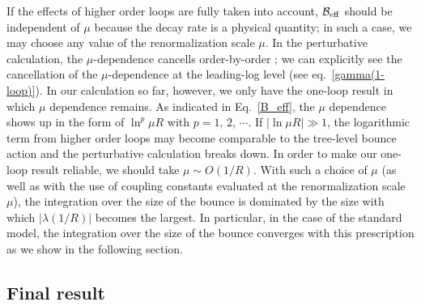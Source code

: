 \documentclass[12pt]{article}
\begin{document}
If the effects of higher order loops are fully taken into account,
$\mathcal{B}_{\rm eff}$ should be independent of $\mu$ because the decay
rate is a physical quantity; in such a case, we may choose any value of
the renormalization scale $\mu$.  In the perturbative calculation, the
$\mu$-dependence cancells order-by-order \cite{Endo:2015ixx}; we can
explicitly see the cancellation of the $\mu$-dependence at the
leading-log level (see eq.\ \eqref{gamma(1-loop)}).  In our calculation
so far, however, we only have the one-loop result in which $\mu$
dependence remains.  As indicated in Eq.\ \eqref{B_eff}, the $\mu$
dependence shows up in the form of $\ln^p \mu R$ with $p=1$, $2$,
$\cdots$.  If $|\ln\mu R|\gg 1$, the logarithmic term from higher order
loops may become comparable to the tree-level bounce action and the
perturbative calculation breaks down.  In order to make our one-loop
result reliable, we should take $\mu\sim O(1/R)$.  With such a choice of
$\mu$ (as well as with the use of coupling constants evaluated at the
renormalization scale $\mu$), the integration over the size of the
bounce is dominated by the size with which $|\lambda (1/R)|$ becomes the
largest.  In particular, in the case of the standard model, the
integration over the size of the bounce converges with this prescription
as we show in the following section.

\subsection{Final result}
\end{document}
